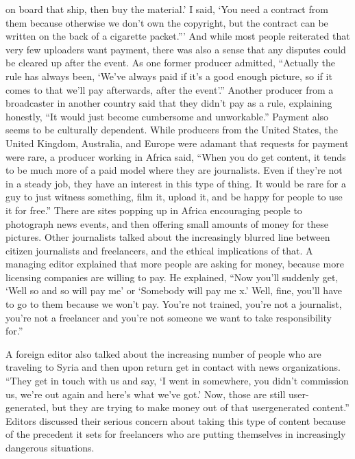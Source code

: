 \begin{enumerate}
on board that ship, then buy the material.' I said, ‘You need a contract from
them because otherwise we don't own the copyright, but the contract can
be written on the back of a cigarette packet.'''
And while most people reiterated that very few uploaders want payment,
there was also a sense that any disputes could be cleared up after the event.
As one former producer admitted, ``Actually the rule has always been, ‘We've
always paid if it's a good enough picture, so if it comes to that we'll pay afterwards,
after the event'.''
Another producer from a broadcaster in another country said that they
didn't pay as a rule, explaining honestly, ``It would just become cumbersome
and unworkable.''
Payment also seems to be culturally dependent. While producers from the
United States, the United Kingdom, Australia, and Europe were adamant
that requests for payment were rare, a producer working in Africa said,
``When you do get content, it tends to be much more of a paid model where
they are journalists. Even if they're not in a steady job, they have an interest
in this type of thing. It would be rare for a guy to just witness something,
film it, upload it, and be happy for people to use it for free.'' There are sites
popping up in Africa encouraging people to photograph news events, and
then offering small amounts of money for these pictures.
Other journalists talked about the increasingly blurred line between citizen
journalists and freelancers, and the ethical implications of that. A managing
editor explained that more people are asking for money, because more
licensing companies are willing to pay. He explained, ``Now you'll suddenly
get, ‘Well so and so will pay me' or ‘Somebody will pay me x.' Well, fine,
you'll have to go to them because we won't pay. You're not trained, you're
not a journalist, you're not a freelancer and you're not someone we want to
take responsibility for.''

A foreign editor also talked about the increasing number of people who are
traveling to Syria and then upon return get in contact with news organizations.
``They get in touch with us and say, ‘I went in somewhere, you didn't
commission us, we're out again and here's what we've got.' Now, those are
still user-generated, but they are trying to make money out of that usergenerated
content.'' Editors discussed their serious concern about taking
this type of content because of the precedent it sets for freelancers who are
putting themselves in increasingly dangerous situations.

\end{enumerate}
